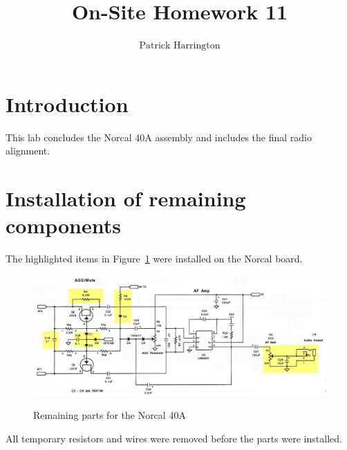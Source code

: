 \documentclass{./cls/hw}
\title{On-Site Homework 11}
\author{$\boxed{\text{Patrick Harrington}}$}
\begin{document}
\maketitle
\section*{Introduction}
This lab concludes the Norcal 40A assembly and includes the final radio
alignment.
\section{Installation of remaining components}
  The highlighted items in Figure~\ref{fig:f} were installed on the Norcal
  board.
  \begin{figure}[h!]
    \centering
    \includegraphics[scale=.5]{./img/final.png}
    \label{fig:f}
    \caption{Remaining parts for the Norcal 40A}
  \end{figure}
  All temporary resistors and wires were removed before the parts were
  installed. 
\end{document}
